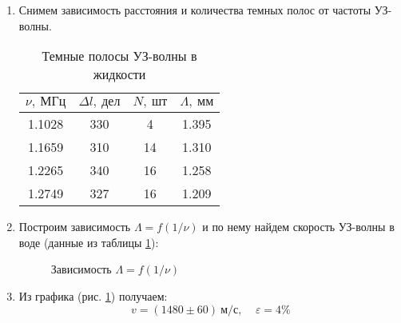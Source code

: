 \documentclass{lab}
\begin{document}
\begin{enumerate}
\item
Снимем зависимость расстояния и количества темных полос от частоты УЗ-волны.
\begin{table}[H]
	\centering
	\begin{tabular}{|c|ccc|}
		\hline
		$ \nu,~МГц $ & $ \Delta l,~дел $ & $ N,~шт $ & $ \Lambda,~мм $ \\ \hline
		1.1028 & 330 & 4  & 1.395 \\
		1.1659 & 310 & 14 & 1.310 \\
		1.2265 & 340 & 16 & 1.258 \\
		1.2749 & 327 & 16 & 1.209 \\ \hline
	\end{tabular}
	\caption{Темные полосы УЗ-волны в жидкости}
	\label{tab 3}
\end{table}

\item
Построим зависимость $ \Lambda = f(1 / \nu) $ и по нему найдем скорость УЗ-волны в воде (данные из таблицы \ref{tab 3}):
\begin{figure}[H]
	\centering
	\caption{Зависимость $ \Lambda = f(1 / \nu) $}
	\label{5}
\end{figure}

\item
Из графика (рис. \ref{5}) получаем:
\begin{equation}
v = (1480 \pm 60)~м/с, ~~~~~ \varepsilon = 4\%
\end{equation}

\end{enumerate}
\end{document}
